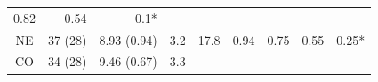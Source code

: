 \documentclass[fleqn,10pt,lineno]{wlpeerj} %
\theoremstyle{definition}
\theoremstyle{definition}
\theoremstyle{definition}
\theoremstyle{remark}
\begin{document}
\begin{longtable}[]{@{}crrrrllrl@{}}
\begin{minipage}[t]{0.06\columnwidth}
0.82\strut
\end{minipage} & \begin{minipage}[t]{0.06\columnwidth}\raggedleft\strut
0.54\strut
\end{minipage} & \begin{minipage}[t]{0.07\columnwidth}\raggedright\strut
0.1*\strut
\end{minipage}\tabularnewline
\begin{minipage}[t]{0.12\columnwidth}\centering\strut
NE\strut
\end{minipage} & \begin{minipage}[t]{0.08\columnwidth}\raggedleft\strut
37 (28)\strut
\end{minipage} & \begin{minipage}[t]{0.13\columnwidth}\raggedleft\strut
8.93 (0.94)\strut
\end{minipage} & \begin{minipage}[t]{0.04\columnwidth}\raggedleft\strut
3.2\strut
\end{minipage} & \begin{minipage}[t]{0.05\columnwidth}\raggedleft\strut
17.8\strut
\end{minipage} & \begin{minipage}[t]{0.11\columnwidth}\raggedright\strut
0.94\strut
\end{minipage} & \begin{minipage}[t]{0.06\columnwidth}\raggedright\strut
0.75\strut
\end{minipage} & \begin{minipage}[t]{0.06\columnwidth}\raggedleft\strut
0.55\strut
\end{minipage} & \begin{minipage}[t]{0.07\columnwidth}\raggedright\strut
0.25*\strut
\end{minipage}\tabularnewline
\begin{minipage}[t]{0.12\columnwidth}\centering\strut
CO\strut
\end{minipage} & \begin{minipage}[t]{0.08\columnwidth}\raggedleft\strut
34 (28)\strut
\end{minipage} & \begin{minipage}[t]{0.13\columnwidth}\raggedleft\strut
9.46 (0.67)\strut
\end{minipage} & \begin{minipage}[t]{0.04\columnwidth}\raggedleft\strut
3.3\strut
\end{minipage} & \begin{minipage}[t]{0.05\columnwidth}\raggedleft\strut

\end{minipage}
\end{longtable}
\end{document}
